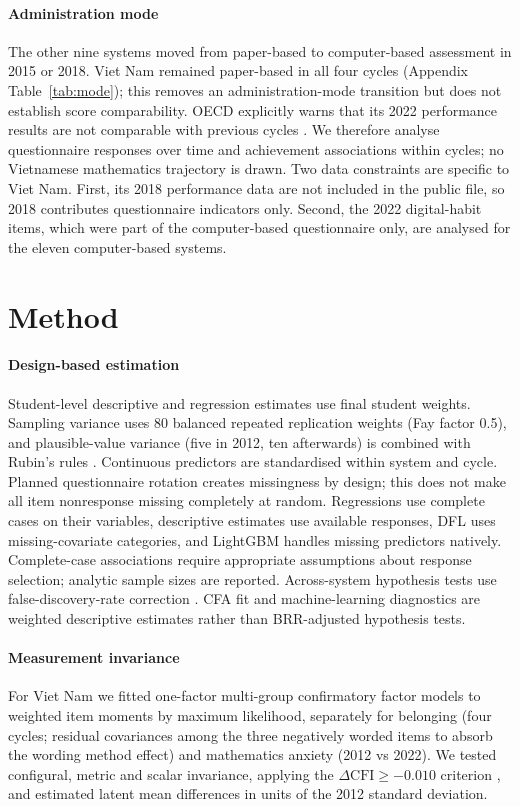 \documentclass[preprint,12pt,authoryear,nonatbib]{elsarticle}
\let\citep\parencite
\begin{document}
\paragraph{Administration mode} The other nine systems moved from paper-based to computer-based assessment in 2015 or 2018. Viet Nam remained paper-based in all four cycles (Appendix Table~\ref{tab:mode}); this removes an administration-mode transition but does not establish score comparability. OECD explicitly warns that its 2022 performance results are not comparable with previous cycles \citep{oecd2023vnm}. We therefore analyse questionnaire responses over time and achievement associations within cycles; no Vietnamese mathematics trajectory is drawn. Two data constraints are specific to Viet Nam. First, its 2018 performance data are not included in the public file, so 2018 contributes questionnaire indicators only. Second, the 2022 digital-habit items, which were part of the computer-based questionnaire only, are analysed for the eleven computer-based systems.

\section{Method}

\paragraph{Design-based estimation} Student-level descriptive and regression estimates use final student weights. Sampling variance uses 80 balanced repeated replication weights (Fay factor 0.5), and plausible-value variance (five in 2012, ten afterwards) is combined with Rubin's rules \citep{oecd2009manual,rubin1987}. Continuous predictors are standardised within system and cycle. Planned questionnaire rotation creates missingness by design; this does not make all item nonresponse missing completely at random. Regressions use complete cases on their variables, descriptive estimates use available responses, DFL uses missing-covariate categories, and LightGBM handles missing predictors natively. Complete-case associations require appropriate assumptions about response selection; analytic sample sizes are reported. Across-system hypothesis tests use false-discovery-rate correction \citep{benjamini1995}. CFA fit and machine-learning diagnostics are weighted descriptive estimates rather than BRR-adjusted hypothesis tests.

\paragraph{Measurement invariance}\label{sec:invariance} For Viet Nam we fitted one-factor multi-group confirmatory factor models to weighted item moments by maximum likelihood, separately for belonging (four cycles; residual covariances among the three negatively worded items to absorb the wording method effect) and mathematics anxiety (2012 vs 2022). We tested configural, metric and scalar invariance, applying the $\Delta\text{CFI} \geq -0.010$ criterion \citep{chen2007,putnick2016}, and estimated latent mean differences in units of the 2012 standard deviation.
\end{document}
